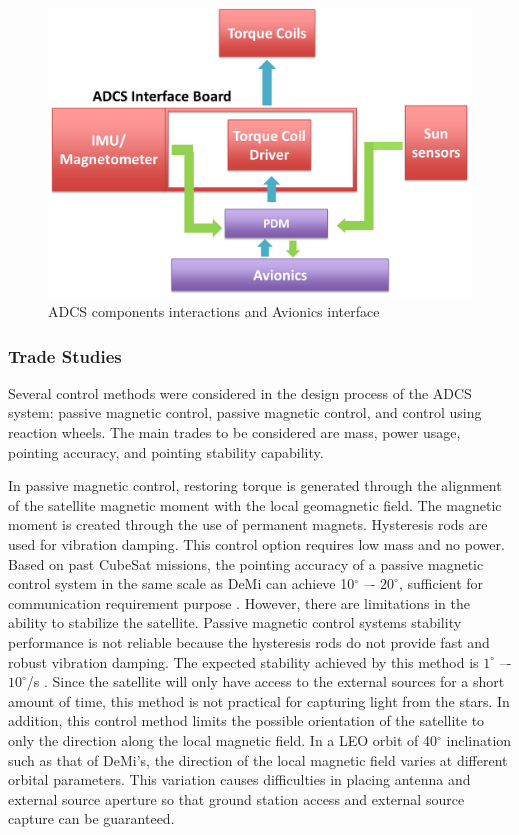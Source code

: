 \documentclass[12pt]{article}
\begin{document}
			\begin{figure}[!ht]
				\centering
				\includegraphics[scale=0.5]{images/ADCS_schem.png}
				\caption{ADCS components interactions and Avionics interface}
				\label{fig:ADCS_schem}
			\end{figure}
			\subsubsection{Trade Studies}
			Several control methods were considered in the design process of the ADCS system: passive magnetic control, passive magnetic control, and control using reaction wheels. The main trades to be considered are mass, power usage, pointing accuracy, and pointing stability capability. 

In passive magnetic control, restoring torque is generated through the alignment of the satellite magnetic moment with the local geomagnetic field. The magnetic moment is created through the use of permanent magnets. Hysteresis rods are used for vibration damping. This control option requires low mass and no power. Based on past CubeSat missions, the pointing accuracy of a passive magnetic control system in the same scale as DeMi can achieve 10$^\circ$ –- $20 ^\circ$, sufficient for communication requirement purpose \cite{adcs_survey} \cite{adcs_smad1}. However, there are limitations in the ability to stabilize the satellite. Passive magnetic control systems stability performance is not reliable because the hysteresis rods do not provide fast and robust vibration damping. The expected stability achieved by this method is $1^\circ$ –- $10 ^\circ$/s \cite{adcs_survey}. Since the satellite will only have access to the external sources for a short amount of time, this method is not practical for capturing light from the stars. In addition, this control method limits the possible orientation of the satellite to only the direction along the local magnetic field. In a LEO orbit of 40$^\circ$ inclination such as that of DeMi’s, the direction of the local magnetic field varies at different orbital parameters. This variation causes difficulties in placing antenna and external source aperture so that ground station access and external source capture can be guaranteed. 
\end{document}
